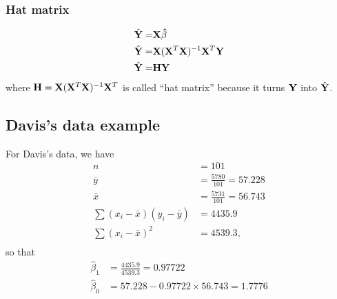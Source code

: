 \subsubsection*{Hat matrix}
$$
\begin{aligned}
\hat{\mathbf{Y}} =& \mathbf{X \hat{\beta}}\\
\hat{\mathbf{Y}} =& \mathbf{X} (\mathbf{X}^T\mathbf{X})^{-1}\mathbf{X}^T\mathbf{Y}\\
\hat{\mathbf{Y}} =& \mathbf{HY}\\
\end{aligned}
$$
%
where $\mathbf{H} = \mathbf{X} (\mathbf{X}^T\mathbf{X})^{-1}\mathbf{X}^T$ is called ``hat matrix'' because it turns $\mathbf{Y}$ into $\hat{\mathbf{Y}}$.

\subsection*{Davis's data example}
For Davis's data, we have
\begin{equation*}
\begin{aligned}
n &= 101 \\
\bar{y} &= \frac{5780}{101} = 57.228\\
\bar{x} &= \frac{5731}{101} = 56.743\\
\sum(x_i - \bar{x})(y_i - \bar{y}) &= 4435.9\\
\sum(x_i - \bar{x})^2 &= 4539.3,\\
\end{aligned}
\end{equation*}
so that
\begin{equation*}
\begin{aligned}
\hat{\beta}_1 &= \frac{4435.9}{4539.3} = 0.97722\\
\hat{\beta}_0 &= 57.228 - 0.97722 \times 56.743 = 1.7776\\
\end{aligned}
\end{equation*}

